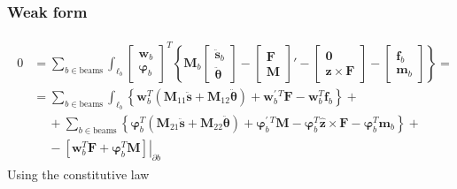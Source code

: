 \documentclass[letterpaper,10pt,english]{jupyterBook}
\begin{document}
\subsubsection*{Weak form}
\begin{equation*}
\begin{split}\begin{aligned}
 0
 & = \sum_{b \in \text{beams}} \int_{\ell_b} \begin{bmatrix} \mathbf{w}_b \\ \boldsymbol\varphi_b \end{bmatrix}^{T} \left\{ \mathbf{M}_b \begin{bmatrix} \ddot{\mathbf{s}}_b \\ \ddot{\boldsymbol\theta} \end{bmatrix} - \begin{bmatrix} \mathbf{F} \\ \mathbf{M} \end{bmatrix}' - \begin{bmatrix} \mathbf{0} \\ \hat{\mathbf{z}} \times \mathbf{F} \end{bmatrix} - \begin{bmatrix} \mathbf{f}_b \\ \mathbf{m}_b \end{bmatrix}  \right\} = \\
 & = \sum_{b \in \text{beams}} \int_{\ell_b} \left\{ \mathbf{w}_b^T \left( \mathbf{M}_{11} \ddot{\mathbf{s}} + \mathbf{M}_{12} \ddot{\boldsymbol{\theta}} \right) + \mathbf{w}_b^{' \ T} \mathbf{F} - \mathbf{w}_b^T \mathbf{f}_b \right\} + \\
 & \quad \ + \sum_{b \in \text{beams}} \left\{ \boldsymbol\varphi_b^T \left( \mathbf{M}_{21} \ddot{\mathbf{s}} + \mathbf{M}_{22} \ddot{\boldsymbol{\theta}} \right) + \boldsymbol\varphi_b^{' \ T} \mathbf{M} - \boldsymbol\varphi_b^T \hat{\mathbf{z}} \times \mathbf{F} - \boldsymbol\varphi_b^T \mathbf{m}_b \right\} + \\
 & \quad \ - \left.\left[ \mathbf{w}_b^T \mathbf{F} + \boldsymbol\varphi^T_b \mathbf{M} \right]\right|_{\partial b}
\end{aligned}\end{split}
\end{equation*}
\sphinxAtStartPar
Using the constitutive law
\end{document}

